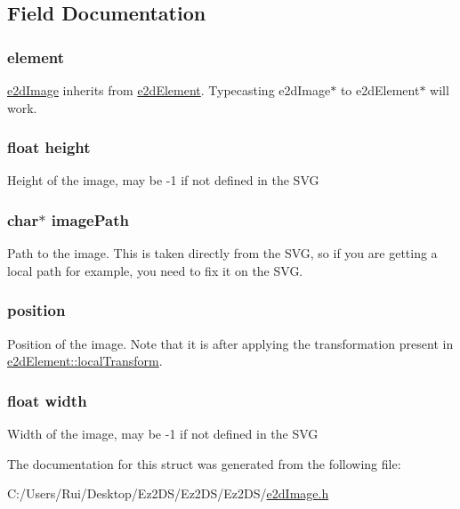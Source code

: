 \subsection{Field Documentation}
\hypertarget{structe2d_image_a55bc7a3a0af41fba9e5b91f390c5928c}{
\subsubsection[{element}]{ {\bf element}}}\label{structe2d_image_a55bc7a3a0af41fba9e5b91f390c5928c}
\hyperlink{structe2d_image}{e2d\-Image} inherits from \hyperlink{structe2d_element}{e2d\-Element}. Typecasting e2d\-Image$\ast$ to e2d\-Element$\ast$ will work. \hypertarget{structe2d_image_a48083b65ac9a863566dc3e3fff09a5b4}{
\subsubsection[{height}]{\setlength{\rightskip}{0pt plus 5cm}float {\bf height}}}\label{structe2d_image_a48083b65ac9a863566dc3e3fff09a5b4}
Height of the image, may be -\/1 if not defined in the S\-V\-G \hypertarget{structe2d_image_afb14ab23ba86115c3b01ad4122943f89}{
\subsubsection[{image\-Path}]{\setlength{\rightskip}{0pt plus 5cm}char$\ast$ {\bf image\-Path}}}\label{structe2d_image_afb14ab23ba86115c3b01ad4122943f89}
Path to the image. This is taken directly from the S\-V\-G, so if you are getting a local path for example, you need to fix it on the S\-V\-G. \hypertarget{structe2d_image_afa8983f25fd6aa6aca18feb07d8d2249}{
\subsubsection[{position}]{ {\bf position}}}\label{structe2d_image_afa8983f25fd6aa6aca18feb07d8d2249}
Position of the image. Note that it is after applying the transformation present in \hyperlink{structe2d_element_a52bda732df714953f93c1e6f5f7c7c93}{e2d\-Element\-::local\-Transform}. \hypertarget{structe2d_image_ae426f00e82704fa09578f5446e22d915}{
\subsubsection[{width}]{\setlength{\rightskip}{0pt plus 5cm}float {\bf width}}}\label{structe2d_image_ae426f00e82704fa09578f5446e22d915}
Width of the image, may be -\/1 if not defined in the S\-V\-G 

The documentation for this struct was generated from the following file\-:\begin{DoxyCompactItemize}
\item 
C\-:/\-Users/\-Rui/\-Desktop/\-Ez2\-D\-S/\-Ez2\-D\-S/\-Ez2\-D\-S/\hyperlink{e2d_image_8h}{e2d\-Image.\-h}\end{DoxyCompactItemize}
